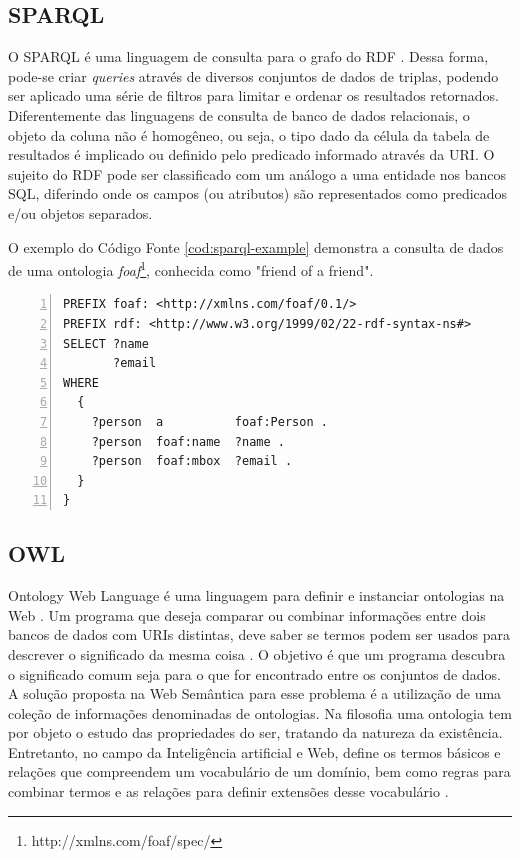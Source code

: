\subsection{SPARQL}

O SPARQL é uma linguagem de consulta para o grafo do RDF \citep{SparqlW3C}. Dessa forma, pode-se criar \textit{queries} através de diversos conjuntos de dados de triplas, podendo ser aplicado uma série de filtros para limitar e ordenar os resultados retornados. Diferentemente das linguagens de consulta de banco de dados relacionais, o objeto da coluna não é homogêneo, ou seja, o tipo dado da célula da tabela de resultados é implicado ou definido pelo predicado informado através da URI. O sujeito do RDF pode ser classificado com um análogo a uma entidade nos bancos SQL, diferindo onde os campos (ou atributos) são representados como predicados e/ou objetos separados.

O exemplo do Código Fonte \ref{cod:sparql-example} demonstra a consulta de dados de uma ontologia \textit{foaf}\footnote{http://xmlns.com/foaf/spec/}, conhecida como "friend of a friend".

\begin{lstlisting}[caption=Exemplo de consulta na linguagem SPARQL, language=SPARQL, frame=single, label={cod:sparql-example}, float, numbers=left]
PREFIX foaf: <http://xmlns.com/foaf/0.1/>
PREFIX rdf: <http://www.w3.org/1999/02/22-rdf-syntax-ns#>
SELECT ?name 
       ?email
WHERE
  {
    ?person  a          foaf:Person .
    ?person  foaf:name  ?name .
    ?person  foaf:mbox  ?email .
  }
}
\end{lstlisting}

\subsection{OWL}

Ontology Web Language é uma linguagem para definir e instanciar ontologias na Web \citep{OWLW3C}. Um programa que deseja comparar ou combinar informações entre dois bancos de dados com URIs distintas, deve saber se termos podem ser usados para descrever o significado da mesma coisa \citep{bernerslee2001semantic}. O objetivo é que um programa descubra o significado comum seja para o que for encontrado entre os conjuntos de dados. A solução proposta na Web Semântica para esse problema é a utilização de uma coleção de informações denominadas de ontologias. Na filosofia uma ontologia tem por objeto o estudo das propriedades do ser, tratando da natureza da existência. Entretanto, no campo da Inteligência artificial e Web, define os termos básicos e relações que compreendem um vocabulário de um domínio, bem como regras para combinar termos e as relações para definir extensões desse vocabulário \citep{Patil:1992:DKS:3087223.3087302}.

